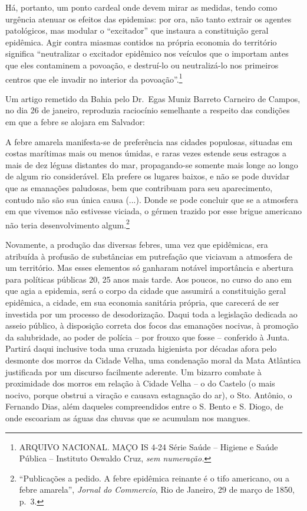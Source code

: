 Há, portanto, um ponto cardeal onde devem mirar as medidas, tendo como
urgência atenuar os efeitos das epidemias: por ora, não tanto extrair os
agentes patológicos, mas modular o ``excitador'' que instaura a
constituição geral epidêmica. Agir contra miasmas contidos na própria
economia do território significa ``neutralizar o excitador epidêmico nos
veículos que o importam antes que eles contaminem a povoação, e
destruí-lo ou neutralizá-lo nos primeiros centros que ele invadir no
interior da povoação''.\footnote{ARQUIVO NACIONAL. MAÇO IS 4-24 Série
  Saúde -- Higiene e Saúde Pública -- Instituto Oswaldo Cruz, \emph{sem
  numeração.}}

Um artigo remetido da Bahia pelo Dr.~Egas Muniz Barreto Carneiro de
Campos, no dia 26 de janeiro, reproduzia raciocínio semelhante a
respeito das condições em que a febre se alojara em Salvador:

A febre amarela manifesta-se de preferência nas cidades populosas,
situadas em costas marítimas mais ou menos úmidas, e raras vezes estende
seus estragos a mais de dez léguas distantes do mar, propagando-se
somente mais longe ao longo de algum rio considerável. Ela prefere os
lugares baixos, e não se pode duvidar que as emanações paludosas, bem
que contribuam para seu aparecimento, contudo não são sua única causa
(...). Donde se pode concluir que se a atmosfera em que vivemos não
estivesse viciada, o gérmen trazido por esse brigue americano não teria
desenvolvimento algum.\footnote{``Publicações a pedido. A febre
  epidêmica reinante é o tifo americano, ou a febre amarela'',
  \emph{Jornal do Commercio}, Rio de Janeiro, 29 de março de 1850, p.~3.}

Novamente, a produção das diversas febres, uma vez que epidêmicas, era
atribuída à profusão de substâncias em putrefação que viciavam a
atmosfera de um território. Mas esses elementos só ganharam notável
importância e abertura para políticas públicas 20, 25 anos mais tarde.
Aos poucos, no curso do ano em que agia a epidemia, será o corpo da
cidade que assumirá a constituição geral epidêmica, a cidade, em sua
economia sanitária própria, que carecerá de ser investida por um
processo de desodorização. Daqui toda a legislação dedicada ao asseio
público, à disposição correta dos focos das emanações nocivas, à
promoção da salubridade, ao poder de polícia -- por frouxo que fosse --
conferido à Junta. Partirá daqui inclusive toda uma cruzada higienista
por décadas afora pelo desmonte dos morros da Cidade Velha, uma
condenação moral da Mata Atlântica justificada por um discurso
facilmente aderente. Um bizarro combate à proximidade dos morros em
relação à Cidade Velha -- o do Castelo (o mais nocivo, porque obstrui a
viração e causava estagnação do ar), o Sto. Antônio, o Fernando Dias,
além daqueles compreendidos entre o S. Bento e S. Diogo, de onde
escoariam as águas das chuvas que se acumulam nos mangues.

